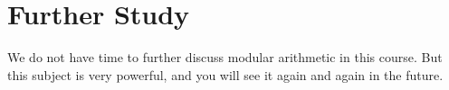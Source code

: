 \documentclass[a4paper,10pt]{report}
\begin{document}
\section{Further Study}

We do not have time to further discuss modular arithmetic in this course. But
this subject is very powerful, and you will see it again and again in the
future.

\printglossaries
\end{document}
